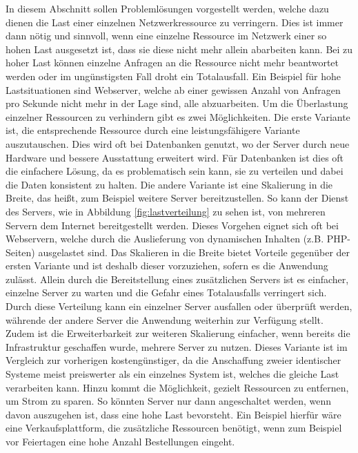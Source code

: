 \documentclass[a4paper, 12pt, BCOR10mm, DIV12, toc=bibliography, toc=listof, german]{scrbook}
\begin{document}
		In diesem Abschnitt sollen Problemlösungen vorgestellt werden, welche dazu dienen die Last einer
		einzelnen Netzwerkressource zu verringern. Dies ist immer dann nötig und sinnvoll, wenn eine
		einzelne Ressource im Netzwerk einer so hohen Last ausgesetzt ist, dass sie diese nicht mehr
		allein abarbeiten kann. Bei zu hoher Last können einzelne Anfragen an die Ressource nicht mehr
		beantwortet werden oder im ungünstigsten Fall droht ein Totalausfall. Ein Beispiel für hohe
		Lastsituationen sind Webserver, welche ab einer gewissen Anzahl von Anfragen pro Sekunde nicht
		mehr in der Lage sind, alle abzuarbeiten. Um die Überlastung einzelner Ressourcen zu verhindern
		gibt es zwei Möglichkeiten. Die erste Variante ist, die entsprechende Ressource durch eine
		leistungsfähigere Variante auszutauschen. Dies wird oft bei Datenbanken genutzt, wo der Server
		durch neue Hardware und bessere Ausstattung erweitert wird.  Für Datenbanken ist dies oft die
		einfachere Lösung, da es problematisch sein kann, sie zu verteilen und dabei die Daten
		konsistent zu halten. Die andere Variante ist eine Skalierung in die Breite, das heißt, zum
		Beispiel weitere Server bereitzustellen. So kann der Dienst des Servers, wie in Abbildung
		\ref{fig:lastverteilung} zu sehen ist, von mehreren Servern dem Internet bereitgestellt werden.
		Dieses Vorgehen eignet sich oft bei Webservern, welche durch die Auslieferung von dynamischen
		Inhalten (z.B. PHP-Seiten) ausgelastet sind. Das Skalieren in die Breite bietet Vorteile
		gegenüber der ersten Variante und ist deshalb dieser vorzuziehen, sofern es die Anwendung
		zulässt. Allein durch die Bereitstellung eines zusätzlichen Servers ist es einfacher, einzelne
		Server zu warten und die Gefahr eines Totalausfalls verringert sich. Durch diese Verteilung kann
		ein einzelner Server ausfallen oder überprüft werden, währende der andere Server die Anwendung
		weiterhin zur Verfügung stellt. Zudem ist die Erweiterbarkeit zur weiteren Skalierung einfacher,
		wenn bereits die Infrastruktur geschaffen wurde, mehrere Server zu nutzen. Dieses Variante ist
		im Vergleich zur vorherigen kostengünstiger, da die Anschaffung zweier identischer Systeme meist
		preiswerter als ein einzelnes System ist, welches die gleiche Last verarbeiten kann.  Hinzu
		kommt die Möglichkeit, gezielt Ressourcen zu entfernen, um Strom zu sparen. So könnten Server
		nur dann angeschaltet werden, wenn davon auszugehen ist, dass eine hohe Last bevorsteht. Ein
		Beispiel hierfür wäre eine Verkaufsplattform, die zusätzliche Ressourcen benötigt, wenn zum
		Beispiel vor Feiertagen eine hohe Anzahl Bestellungen eingeht.
\end{document}
